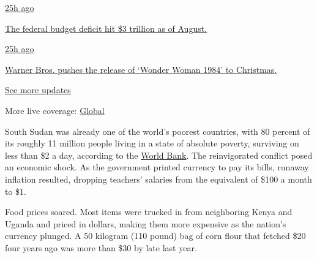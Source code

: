 \href{https://www.nytimes3xbfgragh.onion/live/2020/09/11/business/stock-market-today-coronavirus?action=click\&pgtype=Article\&state=default\&region=MAIN_CONTENT_1\&context=storylines_live_updates\#the-federal-budget-deficit-hit-3-trillion-as-of-august}{25h
ago}

\href{https://www.nytimes3xbfgragh.onion/live/2020/09/11/business/stock-market-today-coronavirus?action=click\&pgtype=Article\&state=default\&region=MAIN_CONTENT_1\&context=storylines_live_updates\#the-federal-budget-deficit-hit-3-trillion-as-of-august}{The
federal budget deficit hit \$3 trillion as of August.}

\href{https://www.nytimes3xbfgragh.onion/live/2020/09/11/business/stock-market-today-coronavirus?action=click\&pgtype=Article\&state=default\&region=MAIN_CONTENT_1\&context=storylines_live_updates\#warner-bros-pushes-the-release-of-wonder-woman-1984-to-christmas}{25h
ago}

\href{https://www.nytimes3xbfgragh.onion/live/2020/09/11/business/stock-market-today-coronavirus?action=click\&pgtype=Article\&state=default\&region=MAIN_CONTENT_1\&context=storylines_live_updates\#warner-bros-pushes-the-release-of-wonder-woman-1984-to-christmas}{Warner
Bros. pushes the release of `Wonder Woman 1984' to Christmas.}

\href{https://www.nytimes3xbfgragh.onion/live/2020/09/11/business/stock-market-today-coronavirus?action=click\&pgtype=Article\&state=default\&region=MAIN_CONTENT_1\&context=storylines_live_updates}{See
more updates}

More live coverage:
\href{https://www.nytimes3xbfgragh.onion/2020/09/11/world/covid-19-coronavirus.html?action=click\&pgtype=Article\&state=default\&region=MAIN_CONTENT_1\&context=storylines_live_updates}{Global}

South Sudan was already one of the world's poorest countries, with 80
percent of its roughly 11 million people living in a state of absolute
poverty, surviving on less than \$2 a day, according to the
\href{https://www.worldbank.org/en/country/southsudan/publication/south-sudan-economic-update-peace-agreement-spurs-economic-recovery-but-poverty-remains}{World
Bank}. The reinvigorated conflict posed an economic shock. As the
government printed currency to pay its bills, runaway inflation
resulted, dropping teachers' salaries from the equivalent of \$100 a
month to \$1.

Food prices soared. Most items were trucked in from neighboring Kenya
and Uganda and priced in dollars, making them more expensive as the
nation's currency plunged. A 50 kilogram (110 pound) bag of corn flour
that fetched \$20 four years ago was more than \$30 by late last year.

